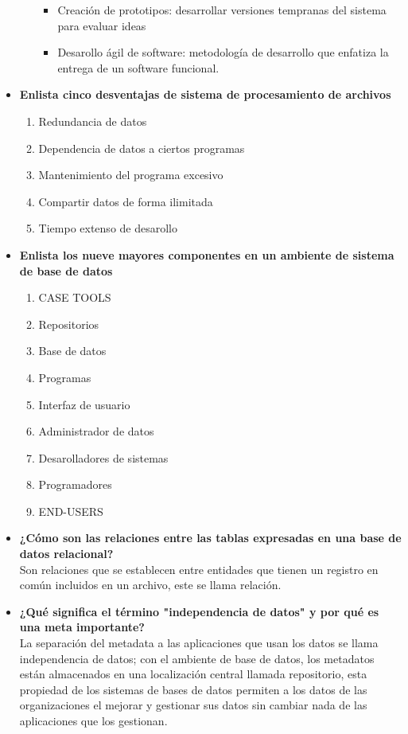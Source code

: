 \documentclass[letterpaper,12pt]{article}
\begin{document}
\begin{sloppypar}
\begin{itemize}
\begin{itemize}
\begin{itemize}
            \item Creación de prototipos: desarrollar versiones tempranas del sistema para evaluar ideas 
            \item Desarollo ágil de software: metodología de desarrollo que enfatiza la entrega de un software funcional.
        \end{itemize}
    \end{itemize}
    \newpage
    \item \textbf{Enlista cinco desventajas de sistema de procesamiento de archivos}
    \begin{enumerate}
        \item Redundancia de datos
        \item Dependencia de datos a ciertos programas
        \item Mantenimiento del programa excesivo
        \item Compartir datos de forma ilimitada
        \item Tiempo extenso de desarollo
    \end{enumerate}
    \item \textbf{Enlista los nueve mayores componentes en un ambiente de sistema de base de datos}
    \begin{enumerate}
        \item CASE TOOLS
        \item Repositorios
        \item Base de datos
        \item Programas
        \item Interfaz de usuario
        \item Administrador de datos
        \item Desarolladores de sistemas
        \item Programadores
        \item END-USERS
    \end{enumerate}
    \item \textbf{¿Cómo son las relaciones entre las tablas expresadas en una base de datos relacional?} \\ Son relaciones que se establecen entre entidades que tienen un registro en común incluidos en un archivo, este se llama relación. 
    \item \textbf{¿Qué significa el término "independencia de datos" y por qué es una meta importante?} \\ La separación del metadata a las aplicaciones que usan los datos se llama independencia de datos; con el ambiente de base de datos, los metadatos están almacenados en una localización central llamada repositorio, esta propiedad de los sistemas de bases de datos permiten a los datos de las organizaciones el mejorar y gestionar sus datos sin cambiar nada de las aplicaciones que los gestionan.

\end{itemize}
\end{sloppypar}
\end{document}
